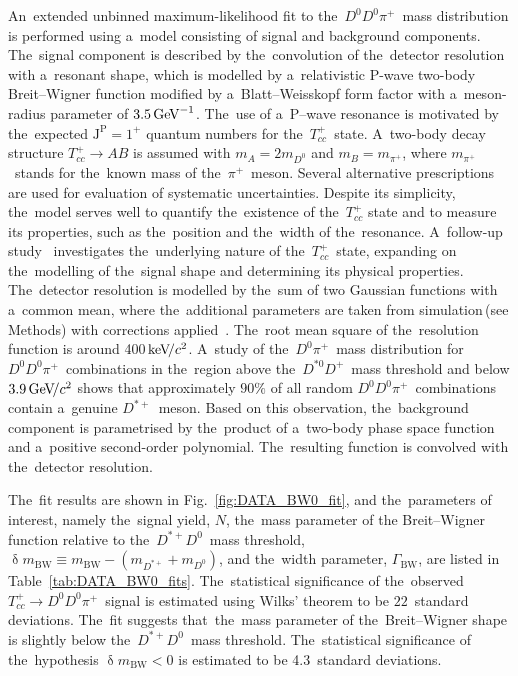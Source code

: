\documentclass[12pt,a4paper]{article}
\def\Ppi         {\ensuremath{\uppi}\xspace}
\def\PA      {\ensuremath{\mathrm{A}}\xspace}
\def\PB      {\ensuremath{\mathrm{B}}\xspace}
\def\PD      {\ensuremath{\mathrm{D}}\xspace}
\def\PT      {\ensuremath{\mathrm{T}}\xspace}
\def\Pc      {\ensuremath{\mathrm{c}}\xspace}
\def\Ppi         {\ensuremath{\pi}\xspace}
\def\PA      {\ensuremath{A}\xspace}
\def\PB      {\ensuremath{B}\xspace}
\def\PD      {\ensuremath{D}\xspace}
\def\PT      {\ensuremath{T}\xspace}
\def\Pc      {\ensuremath{c}\xspace}
\def\cquark    {{\ensuremath{\Pc}}\xspace}
\def\pion   {{\ensuremath{\Ppi}}\xspace}
\def\pip    {{\ensuremath{\pion^+}}\xspace}
\def\D       {{\ensuremath{\PD}}\xspace}
\def\Dz      {{\ensuremath{\D^0}}\xspace}
\def\Dp      {{\ensuremath{\D^+}}\xspace}
\def\Dstarz  {{\ensuremath{\D^{*0}}}\xspace}
\def\Dstarp  {{\ensuremath{\D^{*+}}}\xspace}
\newcommand{\decay}[2]{\ensuremath{#1\!\to #2}\xspace}
\def\to                 {\ensuremath{\rightarrow}\xspace}
\newcommand{\aunit}[1]{\ensuremath{\text{\,#1}}}
\newcommand{\gev}{\aunit{Ge\kern -0.1em V}\xspace}
\newcommand{\gevcc}{\ensuremath{\aunit{Ge\kern -0.1em V\!/}c^2}\xspace}
\def\Tcc {{{\ensuremath{\PT_{\cquark\cquark}^+}}}\xspace}
\newcommand{\kevcc}{\ensuremath{\aunit{ke\kern -0.1em V\!/}c^2}\xspace}
\begin{document}
An~extended unbinned maximum\nobreakdash-likelihood 
fit to the~$\Dz\Dz\pip$~mass
distribution is performed using 
a~model consisting of signal and background components.
The~signal component
is described by the~convolution of 
the~detector resolution with 
a~resonant shape,
which is modelled by 
a~relativistic P\nobreakdash-wave 
two\nobreakdash-body Breit\nobreakdash--Wigner function 
modified by a~\mbox{Blatt}\nobreakdash--Weisskopf 
form factor with a~meson\nobreakdash-radius parameter of $3.5\gev^{-1}$. 
The~use of 
a~P\nobreakdash--wave resonance 
is motivated by 
the~expected $\mathrm{J^P}=1^+$ quantum 
numbers for the~\Tcc~state.
A~two\nobreakdash-body decay 
structure \mbox{$\decay{\Tcc}{\PA\PB}$} 
is assumed with $m_{\PA}=2m_{\Dz}$  and $m_{\PB}=m_{\pip}$,
where $m_{\pip}$~stands for 
the~known mass of the~\pip~meson.
Several alternative prescriptions are used for evaluation
of systematic uncertainties.
Despite its simplicity, 
the~model serves well to quantify 
the~existence of the~$\Tcc$ state and to measure 
its  properties, 
such as the~position and the~width
of the~resonance.
A~follow\nobreakdash-up study~\cite{LHCb-PAPER-2021-032}
investigates the~underlying nature of 
the~\Tcc~state,
expanding on 
the~modelling of the~signal shape
and determining its physical properties.
The~detector resolution  
is modelled by the~sum 
of two Gaussian functions 
with a~common mean, 
where the~additional parameters are 
taken from simulation\,(see Methods) with 
corrections applied~\cite{LHCb-PAPER-2020-008,
LHCb-PAPER-2020-009,
LHCb-PAPER-2020-035}. 
The~root mean square of the~resolution 
function is around 400\kevcc. 
A~study of the~$\Dz\pip$~mass distribution 
for  $\Dz\Dz\pip$~combinations 
in the~region above the~$\Dstarz\Dp$~mass threshold 
and below $3.9\gevcc$ shows 
that  approximately $90\%$ of 
all random $\Dz\Dz\pip$~combinations 
contain a~genuine $\Dstarp$~meson.
Based on this observation, the~background component
is parametrised by the~product of  
a~two\nobreakdash-body phase space 
function and  a~positive second\nobreakdash-order polynomial. 
The~resulting function is convolved 
with the~detector resolution.


The~fit results are shown in 
Fig.~\ref{fig:DATA_BW0_fit}, 
and the~parameters of interest, 
namely the~signal yield, $N$, 
the~mass parameter of the Breit\nobreakdash--Wigner
function relative to the~$\Dstarp\Dz$~mass threshold,  
\mbox{$\updelta m_{\mathrm{BW}}
\equiv m_{\mathrm{BW}}-(m_{\Dstarp}+m_{\Dz})$},
and the~width parameter, $\Gamma_{\mathrm{BW}}$,
are listed in Table~\ref{tab:DATA_BW0_fits}. 
The~statistical significance of the~observed 
\mbox{$\decay{\Tcc}{\Dz\Dz\pip}$}~signal is estimated 
using Wilks' theorem to be $22$~standard deviations.
The~fit suggests that~the~mass parameter of 
the~Breit\nobreakdash--Wigner shape  
is slightly below 
the~$\Dstarp\Dz$~mass threshold. 
The~statistical significance
of the~hypothesis $\updelta m_{\mathrm{BW}}<0$ is 
estimated to be 4.3~standard deviations.
\end{document}

